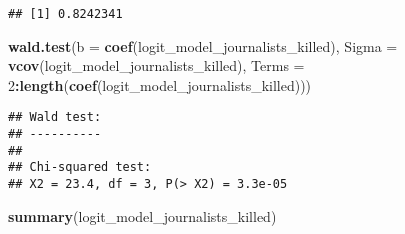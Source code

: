 \documentclass[
  11pt,
]{article}
\newenvironment{Shaded}{\begin{snugshade}}{\end{snugshade}}
\newcommand{\AttributeTok}[1]{\textcolor[rgb]{0.13,0.29,0.53}{#1}}
\newcommand{\DecValTok}[1]{\textcolor[rgb]{0.00,0.00,0.81}{#1}}
\newcommand{\FunctionTok}[1]{\textcolor[rgb]{0.13,0.29,0.53}{\textbf{#1}}}
\newcommand{\NormalTok}[1]{#1}
\newcommand{\OtherTok}[1]{\textcolor[rgb]{0.56,0.35,0.01}{#1}}
\newcommand{\SpecialCharTok}[1]{\textcolor[rgb]{0.81,0.36,0.00}{\textbf{#1}}}
\begin{document}
\begin{Shaded}
\end{Shaded}

\begin{verbatim}
## [1] 0.8242341
\end{verbatim}

\begin{Shaded}
\begin{Highlighting}[]
\FunctionTok{wald.test}\NormalTok{(}\AttributeTok{b =} \FunctionTok{coef}\NormalTok{(logit\_model\_journalists\_killed), }
          \AttributeTok{Sigma =} \FunctionTok{vcov}\NormalTok{(logit\_model\_journalists\_killed), }
          \AttributeTok{Terms =} \DecValTok{2}\SpecialCharTok{:}\FunctionTok{length}\NormalTok{(}\FunctionTok{coef}\NormalTok{(logit\_model\_journalists\_killed)))}
\end{Highlighting}
\end{Shaded}

\begin{verbatim}
## Wald test:
## ----------
## 
## Chi-squared test:
## X2 = 23.4, df = 3, P(> X2) = 3.3e-05
\end{verbatim}

\begin{Shaded}
\begin{Highlighting}[]
\FunctionTok{summary}\NormalTok{(logit\_model\_journalists\_killed)}
\end{Highlighting}
\end{Shaded}
\end{document}
